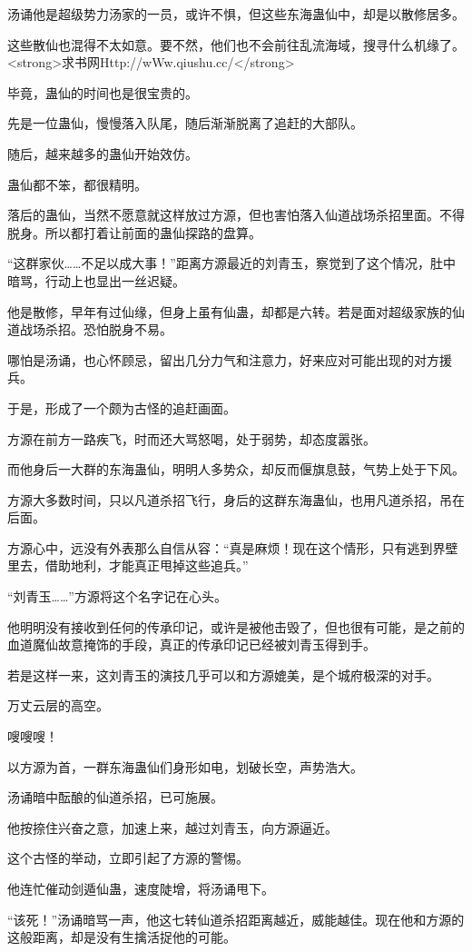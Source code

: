 \begin{this_body}
汤诵他是超级势力汤家的一员，或许不惧，但这些东海蛊仙中，却是以散修居多。

这些散仙也混得不太如意。要不然，他们也不会前往乱流海域，搜寻什么机缘了。<strong>求书网Http://wWw.qiushu.cc/</strong>

毕竟，蛊仙的时间也是很宝贵的。

先是一位蛊仙，慢慢落入队尾，随后渐渐脱离了追赶的大部队。

随后，越来越多的蛊仙开始效仿。

蛊仙都不笨，都很精明。

落后的蛊仙，当然不愿意就这样放过方源，但也害怕落入仙道战场杀招里面。不得脱身。所以都打着让前面的蛊仙探路的盘算。

“这群家伙……不足以成大事！”距离方源最近的刘青玉，察觉到了这个情况，肚中暗骂，行动上也显出一丝迟疑。

他是散修，早年有过仙缘，但身上虽有仙蛊，却都是六转。若是面对超级家族的仙道战场杀招。恐怕脱身不易。

哪怕是汤诵，也心怀顾忌，留出几分力气和注意力，好来应对可能出现的对方援兵。

于是，形成了一个颇为古怪的追赶画面。

方源在前方一路疾飞，时而还大骂怒喝，处于弱势，却态度嚣张。

而他身后一大群的东海蛊仙，明明人多势众，却反而偃旗息鼓，气势上处于下风。

方源大多数时间，只以凡道杀招飞行，身后的这群东海蛊仙，也用凡道杀招，吊在后面。

方源心中，远没有外表那么自信从容：“真是麻烦！现在这个情形，只有逃到界壁里去，借助地利，才能真正甩掉这些追兵。”

“刘青玉……”方源将这个名字记在心头。

他明明没有接收到任何的传承印记，或许是被他击毁了，但也很有可能，是之前的血道魔仙故意掩饰的手段，真正的传承印记已经被刘青玉得到手。

若是这样一来，这刘青玉的演技几乎可以和方源媲美，是个城府极深的对手。

万丈云层的高空。

嗖嗖嗖！

以方源为首，一群东海蛊仙们身形如电，划破长空，声势浩大。

汤诵暗中酝酿的仙道杀招，已可施展。

他按捺住兴奋之意，加速上来，越过刘青玉，向方源逼近。

这个古怪的举动，立即引起了方源的警惕。

他连忙催动剑遁仙蛊，速度陡增，将汤诵甩下。

“该死！”汤诵暗骂一声，他这七转仙道杀招距离越近，威能越佳。现在他和方源的这般距离，却是没有生擒活捉他的可能。


\end{this_body}
